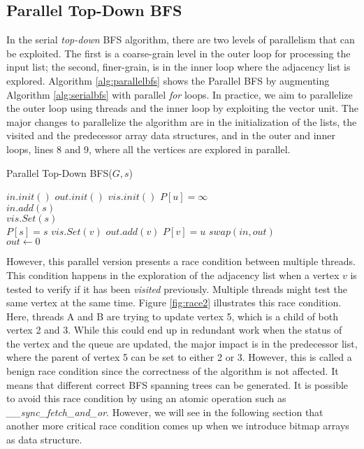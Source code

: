 \documentclass{sig-alternate-05-2015}
\begin{document}
\subsection{Parallel Top-Down BFS}
\label{sec:parBFS}
In the serial \textit{top-down} BFS algorithm, there are two levels of
parallelism that can be exploited. The first is a coarse-grain level
in the outer loop for processing the input list; the second,
finer-grain, is in the inner loop where the adjacency list is
explored. Algorithm \ref{alg:parallelbfs} shows the Parallel BFS by
augmenting Algorithm \ref{alg:serialbfs} with parallel \textit{for}
loops. In practice, we aim to parallelize the outer loop using threads and the inner loop by exploiting the vector unit. The major changes to parallelize the algorithm are in the
initialization of the lists, the visited and the predecessor array
data structures, and in the outer and inner loops, lines 8 and 9,
where all the vertices are explored in parallel.

\begin{algorithm}[H]
\small
\caption{Parallel Top-Down BFS($G, s$) }
\label{alg:parallelbfs}
\begin{algorithmic}[1]
\renewcommand{\algorithmicrequire}{\textbf{Initialize:}}
\REQUIRE $in.init()$
 $out.init()$
 $vis.init()$
\STATE 
$P[u] = \infty$ \\
\ENDFOR
\STATE
$in.add(s)$ \\
\STATE
$vis.Set(s)$ \\
\STATE
$P[s] = s$
\STATE $vis.Set(v)$
\STATE $out.add(v)$
\STATE $P[v] = u $
\ENDIF
\ENDFOR
\ENDFOR
\STATE $swap(in, out)$\\
 $out \leftarrow 0$
\ENDWHILE
\end{algorithmic}
\end{algorithm}

However, this parallel version presents a race condition between
multiple threads. This condition happens in the exploration of the
adjacency list when a vertex $v$ is tested to verify if it has been
\textit{visited} previously. Multiple threads might test the same
vertex at the same time. Figure \ref{fig:race2} illustrates this race
condition. Here, threads A and B are trying to update vertex 5, which
is a child of both vertex 2 and 3. While this could end up in
redundant work when the status of the vertex and the queue are
updated, the major impact is in the predecessor list, where the parent
of vertex 5 can be set to either 2 or 3. However, this is called a
benign race condition since the correctness of the algorithm is not
affected. It means that different correct BFS spanning trees can be
generated. It is possible to avoid this race condition by using an
atomic operation such as \textit{\_\_sync\_fetch\_and\_or}. However,
we will see in the following section that another more critical race
condition comes up when we introduce bitmap arrays as data structure.
\end{document}
